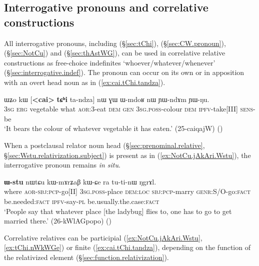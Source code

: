   
\subsection{Interrogative pronouns and correlative constructions} \label{sec:interrogative.relative}
All interrogative pronouns, including   (§\ref{sec:tChi}),  (§\ref{sec:CW.pronoun}),   (§\ref{sec:NotCu}) and  (§\ref{sec:thAstWG}), can be used in correlative relative constructions as free-choice indefinites `whoever/whatever/whenever' (§\ref{sec:interrogative.indef}). The pronoun can occur on its own or in apposition with an overt head noun as in (\ref{ex:cai.tChi.tandza}).

\begin{exe}
\ex \label{ex:cai.tChi.tandza}
\gll ɯʑo kɯ [\textbf{<cai>} \textbf{tɕʰi} ta-ndza] nɯ ɣɯ ɯ-mdoʁ nɯ ɲɯ-ndɤm ɲɯ-ŋu. \\
\textsc{3sg} \textsc{erg} vegetable what \textsc{aor}:3\flobv{}-eat \textsc{dem} \textsc{gen} \textsc{3sg}.\textsc{poss}-colour \textsc{dem} \textsc{ipfv}-take[III] \textsc{sens}-be \\
\glt  `It bears the colour of whatever vegetable it has eaten.' (25-caiqajW)
()
\end{exe}

When a postclausal relator noun head (§\ref{sec:prenominal.relative}, §\ref{sec:Wstu.relativization.subject}) is present as in (\ref{ex:NotCu.jAkAri.Wstu}), the interrogative pronoun remains \textit{in situ}.

\begin{exe}
\ex \label{ex:NotCu.jAkAri.Wstu}
 \textbf{ɯ-stu} nɯtɕu kɯ-mɤrʑaβ kɯ-ɕe ra tu-ti-nɯ ŋgrɤl. \\
where \textsc{aor}-\textsc{sbj}:\textsc{pcp}-go[II] \textsc{3sg}.\textsc{poss}-place \textsc{dem}:\textsc{loc} \textsc{sbj}:\textsc{pcp}-marry \textsc{genr}:S/O-go:\textsc{fact} be.needed:\textsc{fact} \textsc{ipfv}-say-\textsc{pl} be.usually.the.case:\textsc{fact} \\
\glt `People say that whatever place [the ladybug] flies to, one has to go to get married there.' (26-kWlAGpopo)
()
\end{exe}

Correlative relatives can be participial (\ref{ex:NotCu.jAkAri.Wstu}, \ref{ex:tChi.nWkWGe}) or finite (\ref{ex:cai.tChi.tandza}), depending on the function of the relativized element (§\ref{sec:function.relativization}).

